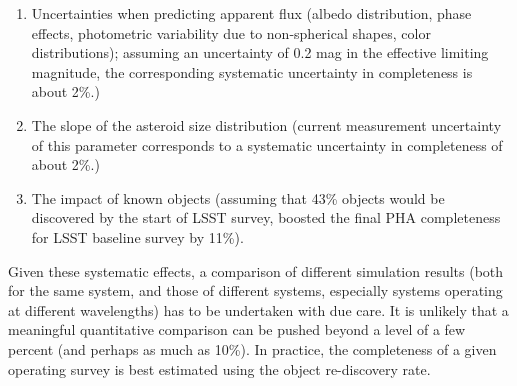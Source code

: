 \begin{enumerate}
\item Uncertainties when predicting apparent flux (albedo distribution, phase effects, photometric variability 
          due to non-spherical shapes, color distributions); assuming an uncertainty of 0.2 mag in the effective 
          limiting magnitude, the corresponding  systematic uncertainty in completeness is about 2\%.)
\item The slope of the asteroid size distribution (current measurement uncertainty of this parameter 
          corresponds to a systematic uncertainty in completeness of about 2\%.)
\item The impact of known objects (assuming that 43\% objects would be discovered by the start of
          LSST survey, \citep{GMS2016} boosted the final PHA completeness for LSST baseline survey by 11\%). 
\end{enumerate} 

Given these systematic effects, a comparison of different simulation results (both for the same system,
and those of different systems, especially systems operating at different wavelengths) has to be undertaken
with due care. It is unlikely that a meaningful quantitative comparison can be pushed beyond a level
of a few percent (and perhaps as much as 10\%). In practice, the completeness of a given operating survey
is best estimated using the object re-discovery rate. 

